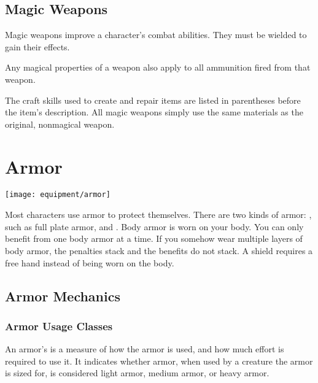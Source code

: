 \begin{longcolumn}
\section{Magic Weapons}
\begin{longtablepreface}

    Magic weapons improve a character's combat abilities.
    They must be wielded to gain their effects.

     Any magical properties of a  weapon also apply to all ammunition fired from that weapon.

     The craft skills used to create and repair items are listed in parentheses before the item's description.
    All magic weapons simply use the same materials as the original, nonmagical weapon.
\end{longtablepreface}

    

\end{longcolumn}

    

\newpage
\section{Armor}\label{Armor}
    \texttt{[image: equipment/armor]}

    Most characters use armor to protect themselves. There are two kinds of armor: , such as full plate armor, and .
    Body armor is worn on your body.
    You can only benefit from one body armor at a time.
    If you somehow wear multiple layers of body armor, the penalties stack and the benefits do not stack.
    A shield requires a free hand instead of being worn on the body.

    \subsection{Armor Mechanics}

        \subsubsection{Armor Usage Classes}\label{Armor Usage Classes}
            An armor's  is a measure of how the armor is used, and how much effort is required to use it.
            It indicates whether armor, when used by a creature the armor is sized for, is considered light armor, medium armor, or heavy armor.

